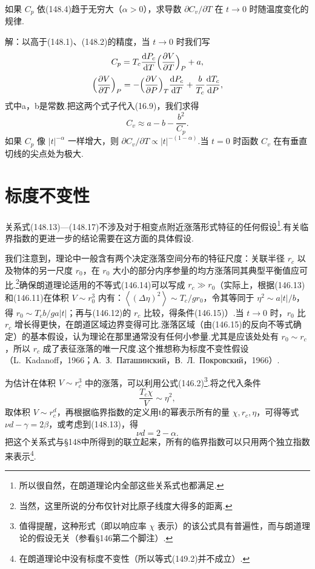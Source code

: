 \begin{xiti}

如果 $C_p$ 依(148.4)趋于无穷大（$\alpha>0$），求导数 $\partial C_v/\partial T$ 在 $t\to0$ 时随温度变化的规律.

解：以高于(148.1)、(148.2)的精度，当 $t\to0$ 时我们写
\begin{equation*}
  C_p=T_c\frac{\mathrm{d}P_c}{\mathrm{d}T}
  \Bigl(\frac{\partial V}{\partial T}\Bigr)_P+a,
\end{equation*}
\begin{equation*}
  \Bigl(\frac{\partial V}{\partial T}\Bigr)_P
  =-\Bigl(\frac{\partial V}{\partial P}\Bigr)_T\frac{\mathrm{d}P_c}{\mathrm{d}T}
  +\frac{b}{T_c}\frac{\mathrm{d}T_c}{\mathrm{d}P},
\end{equation*}
式中a，b是常数.把这两个式子代入(16.9)，我们求得
\begin{equation*}
  C_v\approx a-b-\frac{b^2}{C_p}.
\end{equation*}
如果 $C_p$ 像 $|t|^{-\alpha}$ 一样增大，则 $\partial C_v/\partial T\propto|t|^{-(1-\alpha)}$.当 $t=0$ 时函数 $C_v$ 在有垂直切线的尖点处为极大.

\end{xiti}

\section{标度不变性}

关系式(148.13)—(148.17)不涉及对于相变点附近涨落形式特征的任何假设\footnote{所以很自然，在朗道理论内全部这些关系式也都满足.}.有关临界指数的更进一步的结论需要在这方面的具体假设.

我们注意到，理论中一般含有两个决定涨落空间分布的特征尺度：关联半径 $r_c$ 以及物体的另一尺度 $r_0$，在 $r_0$ 大小的部分内序参量的均方涨落同其典型平衡值应可比.\footnote{当然，这里所说的分布仅针对比原子线度大得多的距离.}确保朗道理论适用的不等式(146.14)可以写成 $r_c\gg r_0$（实际上，根据(146.13)和(146.11)在体积 $V\sim r_0^3$ 内有：$\left\langle(\Delta\eta)^2\right\rangle\sim T_c/gr_0$，令其等同于 $\eta^2\sim a|t|/b$，得 $r_0\sim T_cb/ga|t|$；再与(146.12)的 $r_c$ 比较，得条件(146.15)）.当 $t\to0$ 时，$r_0$ 比 $r_c$ 增长得更快，在朗道区域边界变得可比.涨落区域（由(146.15)的反向不等式确定）的基本假设，认为理论在那里通常没有任何小参量.尤其是应该处处有 $r_0\sim r_c$，所以 $r_c$ 成了表征涨落的唯一尺度.这个推想称为标度不变性假设（L.~Kadanoff，1966；А.~З.~Паташинский，В.~Л.~Покровский，1966）.

为估计在体积 $V\sim r_c^3$ 中的涨落，可以利用公式(146.2)\footnote{值得提醒，这种形式（即以响应率 $\chi$ 表示）的该公式具有普遍性，而与朗道理论的假设无关（参看§146第二个脚注）.}.将之代入条件
\begin{equation}
  \frac{T_c\chi}{V}\sim\eta^2,
\end{equation}
取体积 $V\sim r_c^d$，再根据临界指数的定义用t的幂表示所有的量 $\chi,r_c,\eta$，可得等式 $\nu d-\gamma=2\beta$，或考虑到(148.13)，得
\begin{equation}
  \nu d=2-\alpha.
\end{equation}
把这个关系式与§148中所得到的联立起来，所有的临界指数可以只用两个独立指数来表示\footnote{在朗道理论中没有标度不变性（所以等式(149.2)并不成立）.}.

